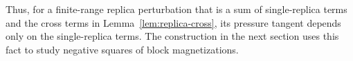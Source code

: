 Thus, for a finite-range replica perturbation that is a sum of
single-replica terms and the cross terms in
Lemma~\ref{lem:replica-cross}, its pressure tangent depends only on
the single-replica terms.  The construction in the next section uses
this fact to study negative squares of block magnetizations.
